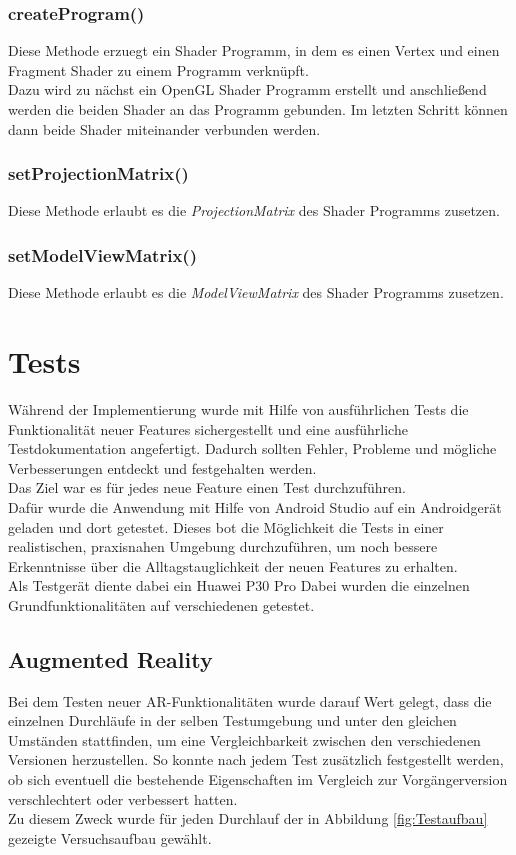 \subsubsection{createProgram()}
Diese Methode erzuegt ein Shader Programm, in dem es einen Vertex und einen Fragment Shader zu einem Programm verknüpft.\\
Dazu wird zu nächst ein OpenGL Shader Programm erstellt und anschließend werden die beiden Shader an das Programm gebunden. 
Im letzten Schritt können dann beide Shader miteinander verbunden werden.

\subsubsection{setProjectionMatrix()}
Diese Methode erlaubt es die \textit{ProjectionMatrix} des Shader Programms zusetzen.

\subsubsection{setModelViewMatrix()}
Diese Methode erlaubt es die \textit{ModelViewMatrix} des Shader Programms zusetzen.


\section{Tests}\label{sec:tests}
Während der Implementierung wurde mit Hilfe von ausführlichen Tests die Funktionalität neuer Features sichergestellt und eine ausführliche Testdokumentation angefertigt. Dadurch sollten Fehler, Probleme und mögliche Verbesserungen entdeckt und festgehalten werden. \\
Das Ziel war es für jedes neue Feature einen Test durchzuführen.\\
Dafür wurde die Anwendung mit Hilfe von Android Studio auf ein Androidgerät geladen und dort getestet.
Dieses bot die Möglichkeit die Tests in einer realistischen, praxisnahen Umgebung durchzuführen, um noch bessere Erkenntnisse über die Alltagstauglichkeit der neuen Features zu erhalten. \\
Als Testgerät diente dabei ein Huawei P30 Pro
Dabei wurden die einzelnen Grundfunktionalitäten auf verschiedenen getestet.

\subsection{Augmented Reality}\label{sec:Testdurchführung}
Bei dem Testen neuer AR-Funktionalitäten wurde darauf Wert gelegt, dass die einzelnen Durchläufe in der selben Testumgebung und unter den gleichen Umständen stattfinden, um eine Vergleichbarkeit zwischen den verschiedenen Versionen herzustellen.
So konnte nach jedem Test zusätzlich festgestellt werden, ob sich eventuell die bestehende Eigenschaften im Vergleich zur Vorgängerversion verschlechtert oder verbessert hatten. \\
Zu diesem Zweck wurde für jeden Durchlauf der in Abbildung \ref{fig:Testaufbau} gezeigte Versuchsaufbau gewählt.

